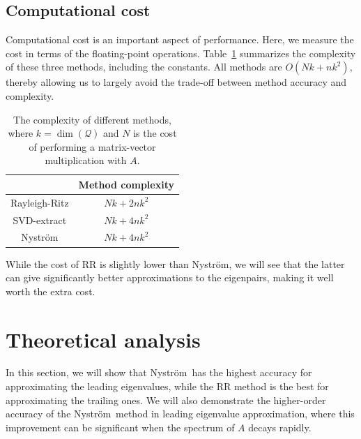 \documentclass[onefignum,onetabnum]{siamart251216}
\def\subspace{\mathcal{Q}}
\def\Nystrom{Nystr{\"o}m}
\def\svdmethod{SVD-extract}
\begin{document}
\subsection{Computational cost}
Computational cost is an important aspect of performance. Here, we measure the cost in terms of the floating-point operations. Table~\ref{table:method-complexity-table} summarizes the complexity of these three methods, including the constants. All methods are $O(Nk+nk^2)$, thereby allowing us to largely avoid the trade-off between method accuracy and complexity. 

\begin{table}[ht]
    \centering
    \caption{The complexity of different methods, where $k = \dim(\subspace)$ and $N$ is the cost of performing a matrix-vector multiplication with $A$.
    }
    \label{table:method-complexity-table}
    \begin{tabular}{c|c}
        \hline
        & Method complexity \\
        \hline
        Rayleigh-Ritz & $Nk + 2nk^2$ \\
        \svdmethod & $Nk + 4nk^2$ \\
        \Nystrom & $Nk+ 4nk^2$ \\
        \hline
    \end{tabular}
\end{table}

While the cost of RR is slightly lower than \Nystrom, we will see that the latter can give significantly better approximations to the eigenpairs, making it well worth the extra cost. 


\section{Theoretical analysis}
\label{sec:Theoretical-analysis-section}
In this section, we will show that  \Nystrom\ has the highest accuracy for approximating the leading eigenvalues, while the RR method is the best for approximating the trailing ones. We will also demonstrate the higher-order accuracy of the \Nystrom\ method in leading eigenvalue approximation, where this improvement can be significant when the spectrum of $A$ decays rapidly.
\end{document}
